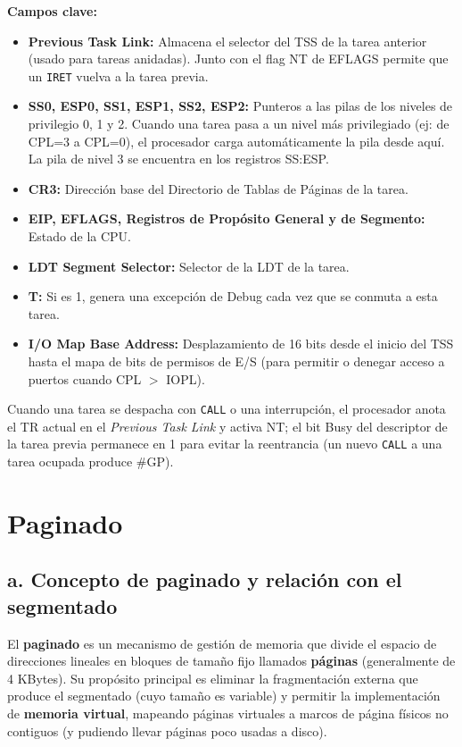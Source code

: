 \documentclass[RT]{UTNLSE}
\begin{document}
\textbf{Campos clave:}
\begin{itemize}
    \item \textbf{Previous Task Link:} Almacena el selector del TSS de la tarea anterior (usado para tareas anidadas). Junto con el flag NT de EFLAGS permite que un \texttt{IRET} vuelva a la tarea previa.
    \item \textbf{SS0, ESP0, SS1, ESP1, SS2, ESP2:} Punteros a las pilas de los niveles de privilegio 0, 1 y 2. Cuando una tarea pasa a un nivel más privilegiado (ej: de CPL=3 a CPL=0), el procesador carga automáticamente la pila desde aquí. La pila de nivel 3 se encuentra en los registros SS:ESP.
    \item \textbf{CR3:} Dirección base del Directorio de Tablas de Páginas de la tarea.
    \item \textbf{EIP, EFLAGS, Registros de Propósito General y de Segmento:} Estado de la CPU.
    \item \textbf{LDT Segment Selector:} Selector de la LDT de la tarea.
    \item \textbf{T:} Si es 1, genera una excepción de Debug cada vez que se conmuta a esta tarea.
    \item \textbf{I/O Map Base Address:} Desplazamiento de 16 bits desde el inicio del TSS hasta el mapa de bits de permisos de E/S (para permitir o denegar acceso a puertos cuando CPL $>$ IOPL).
\end{itemize}
Cuando una tarea se despacha con \texttt{CALL} o una interrupción, el procesador anota el TR actual en el \emph{Previous Task Link} y activa NT; el bit Busy del descriptor de la tarea previa permanece en 1 para evitar la reentrancia (un nuevo \texttt{CALL} a una tarea ocupada produce \#GP).

\section{Paginado}

\subsection*{a. Concepto de paginado y relación con el segmentado}
El \textbf{paginado} es un mecanismo de gestión de memoria que divide el espacio de direcciones lineales en bloques de tamaño fijo llamados \textbf{páginas} (generalmente de 4 KBytes). 
Su propósito principal es eliminar la fragmentación externa que produce el segmentado (cuyo tamaño es variable) y permitir la implementación de \textbf{memoria virtual}, mapeando páginas virtuales a marcos de página físicos no contiguos (y pudiendo llevar páginas poco usadas a disco).
\end{document}
